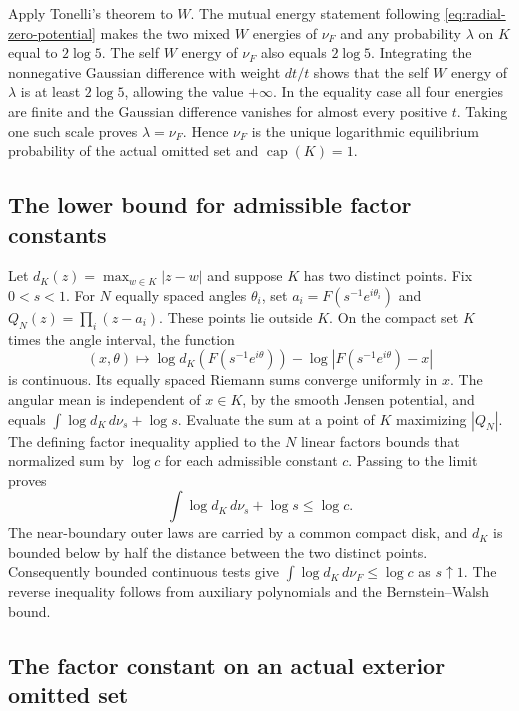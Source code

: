 \documentclass[11pt]{article}
\begin{document}
	Apply Tonelli's theorem to $W$. The mutual energy statement following
	\eqref{eq:radial-zero-potential} makes the two mixed $W$ energies
	of $\nu_F$ and any probability $\lambda$ on $K$ equal to $2\log 5$.
	The self $W$ energy of $\nu_F$ also equals $2\log 5$. Integrating the
	nonnegative Gaussian difference with weight $dt/t$ shows that the
	self $W$ energy of $\lambda$ is at least $2\log 5$, allowing the
	value $+\infty$. In the equality case all four energies are finite
	and the Gaussian difference vanishes for almost every positive $t$.
	Taking one such scale proves $\lambda=\nu_F$. Hence $\nu_F$ is the
	unique logarithmic equilibrium probability of the actual omitted set
	and $\operatorname{cap}(K)=1$.
	
	\subsection{The lower bound for admissible factor constants}
	
	Let $d_K(z)=\max_{w\in K}|z-w|$ and suppose $K$ has two distinct
	points. Fix $0<s<1$. For $N$ equally spaced angles $\theta_i$, set
	$a_i=F(s^{-1}e^{i\theta_i})$ and $Q_N(z)=\prod_i(z-a_i)$. These
	points lie outside $K$. On the compact set $K$ times the angle
	interval, the function
	\[
	(x,\theta)\longmapsto
	\log d_K(F(s^{-1}e^{i\theta}))-\log|F(s^{-1}e^{i\theta})-x|
	\]
	is continuous. Its equally spaced Riemann sums converge uniformly
	in $x$. The angular mean is independent of $x\in K$, by the smooth
	Jensen potential, and equals
	$\int\log d_K\,d\nu_s+\log s$. Evaluate the sum at a point of $K$
	maximizing $|Q_N|$. The defining factor inequality applied to the
	$N$ linear factors bounds that normalized sum by $\log c$ for
	each admissible constant $c$. Passing to the limit proves
	\[
	\int\log d_K\,d\nu_s+\log s\le \log c.
	\]
	The near-boundary outer laws are carried by a common compact disk,
	and $d_K$ is bounded below by half the distance between the two
	distinct points. Consequently bounded continuous tests give
	$\int\log d_K\,d\nu_F\le\log c$ as $s\uparrow1$.
	The reverse inequality follows from auxiliary polynomials and the
	Bernstein--Walsh bound.
	
	\subsection{The factor constant on an actual exterior omitted set}
	\label{sec:actual-factor-formula}
	
\end{document}
